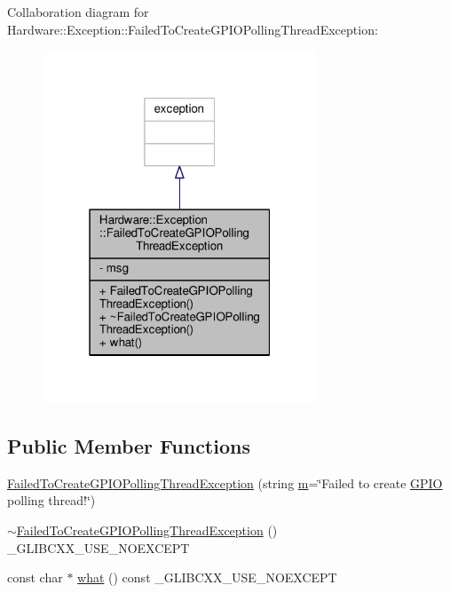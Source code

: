 Collaboration diagram for Hardware\+:\+:Exception\+:\+:Failed\+To\+Create\+G\+P\+I\+O\+Polling\+Thread\+Exception\+:\nopagebreak
\begin{figure}[H]
\begin{center}
\leavevmode
\includegraphics[width=232pt]{class_hardware_1_1_exception_1_1_failed_to_create_g_p_i_o_polling_thread_exception__coll__graph}
\end{center}
\end{figure}
\subsection*{Public Member Functions}
\begin{DoxyCompactItemize}
\item 
\hyperlink{class_hardware_1_1_exception_1_1_failed_to_create_g_p_i_o_polling_thread_exception_a5505ab7e6613c84c9398bff4e2147510}{Failed\+To\+Create\+G\+P\+I\+O\+Polling\+Thread\+Exception} (string \hyperlink{_gen_blob_8m_ab3cd915d758008bd19d0f2428fbb354a}{m}=\char`\"{}Failed to create \hyperlink{class_hardware_1_1_g_p_i_o}{G\+P\+I\+O} polling thread!\char`\"{})
\item 
\hyperlink{class_hardware_1_1_exception_1_1_failed_to_create_g_p_i_o_polling_thread_exception_a078b506abc9790bee2c334709bf1bfe3}{$\sim$\+Failed\+To\+Create\+G\+P\+I\+O\+Polling\+Thread\+Exception} () \+\_\+\+G\+L\+I\+B\+C\+X\+X\+\_\+\+U\+S\+E\+\_\+\+N\+O\+E\+X\+C\+E\+P\+T
\item 
const char $\ast$ \hyperlink{class_hardware_1_1_exception_1_1_failed_to_create_g_p_i_o_polling_thread_exception_a27a85519693a4b569b324bfbf95e4bc6}{what} () const \+\_\+\+G\+L\+I\+B\+C\+X\+X\+\_\+\+U\+S\+E\+\_\+\+N\+O\+E\+X\+C\+E\+P\+T
\end{DoxyCompactItemize}
